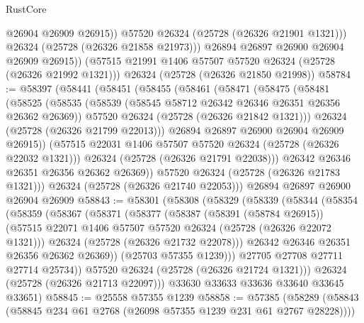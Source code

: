 \begin{lexlean}{RustCore}
\begin{coremodule}
                @26904
                @26909
                @26915))
            @57520
            @26324
            (@25728 (@26326 @21901 @1321)))
          @26324
          (@25728 (@26326 @21858 @21973)))
        @26894
        @26897
        @26900
        @26904
        @26909
        @26915))
    (@57515 @21991 @1406 @57507 @57520 @26324 (@25728 (@26326 @21992 @1321)))
    @26324
    (@25728 (@26326 @21850 @21998))
@58784 := @58397
    (@58441
      (@58451
        (@58455
          (@58461
            (@58471
              (@58475
                (@58481
                  (@58525
                    (@58535
                      (@58539 (@58545 @58712 @26342 @26346 @26351 @26356 @26362 @26369))
                      @57520
                      @26324
                      (@25728 (@26326 @21842 @1321)))
                    @26324
                    (@25728 (@26326 @21799 @22013)))
                  @26894
                  @26897
                  @26900
                  @26904
                  @26909
                  @26915))
              (@57515 @22031 @1406 @57507 @57520 @26324 (@25728 (@26326 @22032 @1321)))
              @26324
              (@25728 (@26326 @21791 @22038)))
            @26342
            @26346
            @26351
            @26356
            @26362
            @26369))
        @57520
        @26324
        (@25728 (@26326 @21783 @1321)))
      @26324
      (@25728 (@26326 @21740 @22053)))
    @26894
    @26897
    @26900
    @26904
    @26909
@58843 := @58301
    (@58308
      (@58329
        (@58339
          (@58344
            (@58354
              (@58359
                (@58367
                  (@58371
                    (@58377
                      (@58387
                        (@58391 (@58784 @26915))
                        (@57515 @22071 @1406 @57507 @57520 @26324 (@25728 (@26326 @22072 @1321)))
                        @26324
                        (@25728 (@26326 @21732 @22078)))
                      @26342
                      @26346
                      @26351
                      @26356
                      @26362
                      @26369))
                  (@25703 @57355 @1239)))
              @27705
              @27708
              @27711
              @27714
              @25734))
          @57520
          @26324
          (@25728 (@26326 @21724 @1321)))
        @26324
        (@25728 (@26326 @21713 @22097)))
      @33630
      @33633
      @33636
      @33640
      @33645
      @33651)
@58845 := @25558 @57355 @1239
@58858 := @57385
    (@58289 (@58843 (@58845 @234 @61 @2768 (@26098 @57355 @1239 @231 @61 @2767 @28228))))

\end{coremodule}
\end{lexlean}
